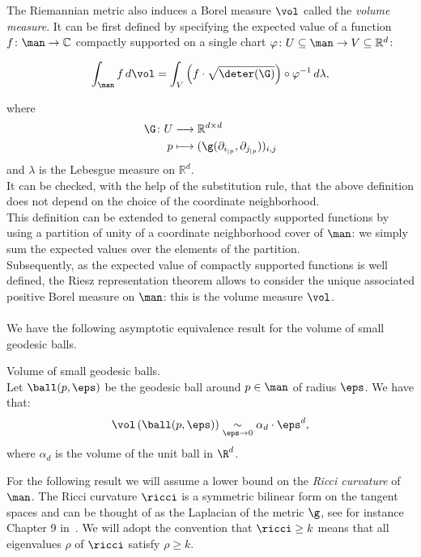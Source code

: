 The Riemannian metric also induces a Borel measure $\vol$ called the {\it volume measure}. It can be first defined by specifying the expected value of a function $f\colon\man\rightarrow\mathbb{C}$ compactly supported on a single chart $\varphi\colon U\subseteq\man\rightarrow V\subseteq\mathbb{R}^d$:

$$\int_{\man}f\,d\vol=\int_{V}\left(f\cdot\sqrt{\deter(\G)}\right)\circ\varphi^{-1}\,d\lambda,$$

where \begin{align*}
\G\colon U&\longrightarrow\mathbb{R}^{d\times d}\\
p&\longmapsto(\g(\partial_{i_{|p}},\partial_{j_{|p}}))_{i,j}
\end{align*}
and $\lambda$ is the Lebesgue measure on $\mathbb{R}^d$.\\
It can be checked, with the help of the substitution rule, that the above definition does not depend on the choice of the coordinate neighborhood.\\
This definition can be extended to general compactly supported functions by using a partition of unity of a coordinate neighborhood cover of $\man$: we simply sum the expected values over the elements of the partition.\\
Subsequently, as the expected value of compactly supported functions is well defined, the Riesz representation theorem allows to consider the unique associated positive Borel measure on $\man$: this is the volume measure $\vol$.\\\\
 We have the following asymptotic equivalence result for the volume of small geodesic balls.
\begin{proposition}{Volume of small geodesic balls.}\label{prop:geo_vol}\\
Let $\ball(p,\eps)$ be the geodesic ball around $p\in\man$ of radius $\eps$. We have that:
$$\vol\left(\ball(p,\eps)\right)\underset{\eps\rightarrow 0}{\sim} \alpha_d\cdot\eps^d,$$
where $\alpha_d$ is the volume of the unit ball in $\R^d$.
%
\end{proposition}

For the following result we will assume a lower bound on the {\it Ricci curvature} of $\man$. The Ricci curvature $\ricci$ is a symmetric bilinear form on the tangent spaces and can be thought of as the Laplacian of the metric $\g$, see for instance Chapter 9 in~\cite{petersen2006riemannian}. We will adopt the convention that $\ricci\geq k$ means that all eigenvalues $\rho$ of $\ricci$ satisfy $\rho\geq k$. 

